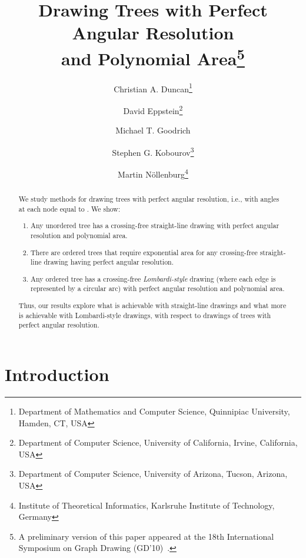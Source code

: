 \documentclass[11pt]{article}
\newcommand{\highlight}[1]{{\itshape #1}}
\begin{document}
	\title{Drawing Trees with Perfect Angular Resolution\\ and
	  Polynomial Area\footnote{A preliminary version of this paper appeared at the 18th International Symposium on Graph Drawing (GD'10)~\cite{degkn-dtwpa-10}.}}

	\author{Christian A. Duncan\thanks{Department of Mathematics and Computer Science, Quinnipiac University, Hamden, CT, USA} \and
	  David Eppstein\thanks{Department of Computer Science, University of California, Irvine, California, USA} \and
	  Michael T. Goodrich \and
	  Stephen G. Kobourov\thanks{Department of Computer Science, University of Arizona, Tucson, Arizona, USA} \and
	  Martin N\"ollenburg\thanks{Institute of Theoretical Informatics, Karlsruhe Institute of Technology, Germany}}

\date{}
\maketitle

\begin{abstract}
	We study methods for drawing
	trees with perfect angular resolution, i.e.,
	with angles at each node  equal to .
	We show:
	\begin{enumerate}
	\item
	Any unordered tree has a crossing-free straight-line drawing
	with perfect angular resolution and polynomial area.
	\item
	There are ordered trees that require exponential area for any
	crossing-free straight-line drawing having perfect angular
	resolution.
	\item
	Any ordered tree has a crossing-free \highlight{Lombardi-style} drawing 
	(where each edge is represented by a circular arc)
	with perfect angular resolution and polynomial area.
	\end{enumerate}
	Thus, our results explore what is achievable with straight-line drawings and 
	what more is achievable with
	Lombardi-style drawings, with respect to drawings of trees with
	perfect angular resolution.
\end{abstract}


\newpage


\section{Introduction}
\label{sec:intro}
\end{document}
